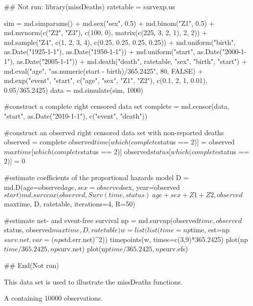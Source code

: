 \documentclass[a4paper]{book}
\begin{document}
\begin{Examples}
\begin{ExampleCode}
## Not run: 
library(missDeaths)
ratetable = survexp.us

sim = md.simparams() +
          md.sex("sex", 0.5) + 
          md.binom("Z1", 0.5) +
          md.mvnorm(c("Z2", "Z3"), c(100, 0), matrix(c(225, 3, 2, 1), 2, 2)) +
          md.sample("Z4", c(1, 2, 3, 4), c(0.25, 0.25, 0.25, 0.25)) +
          md.uniform("birth", as.Date("1925-1-1"), as.Date("1950-1-1")) +
          md.uniform("start", as.Date("2000-1-1"), as.Date("2005-1-1")) +
          md.death("death", ratetable, "sex", "birth", "start") +
          md.eval("age", "as.numeric(start - birth)/365.2425", 80, FALSE) + 
          md.exp("event", "start", c("age", "sex", "Z1", "Z2"), 
             c(0.1, 2, 1, 0.01), 0.05/365.2425)
data = md.simulate(sim, 1000)
          
#construct a complete right censored data set
complete = md.censor(data, "start", as.Date("2010-1-1"), c("event", "death"))

#construct an observed right censored data set with non-reported deaths
observed = complete
observed$time[which(complete$status == 2)] = observed$maxtime[which(complete$status == 2)]
observed$status[which(complete$status == 2)] = 0

#estimate coefficients of the proportional hazards model
D = md.D(age=observed$age, sex=observed$sex, year=observed$start)
md.survcox(observed, Surv(time, status) ~ age + sex + Z1 + Z2, 
          observed$maxtime, D, ratetable, iterations=4, R=50)
          
#estimate net- and event-free survival
np = md.survnp(observed$time, observed$status, observed$maxtime, D, ratetable)
w = list(list(time=np$time, est=np$surv.net, var=(np$std.err.net)^2))
timepoints(w, times=c(3,9)*365.2425)
plot(np$time/365.2425, np$surv.net)
plot(np$time/365.2425, np$surv.efs)

## End(Not run)
\end{ExampleCode}
\end{Examples}
%
\begin{Description}\relax
This data set is used to illustrate the missDeaths functions.
\end{Description}
%
\begin{Format}
A  containing 10000 observations.
\end{Format}
\printindex{}
\end{document}
